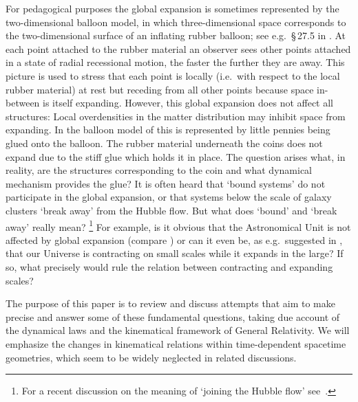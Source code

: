 \documentclass
[rmp,aps,twocolumn,showpacs,preprintnumbers,amsmath,amssymb]{revtex4}
\theoremstyle{plain}
\theoremstyle{definition}
\theoremstyle{remark}
\begin{document}
For pedagogical purposes the global expansion is sometimes represented 
by the two-dimensional balloon model, in which three-dimensional space 
corresponds to the two-dimensional surface of an inflating rubber balloon; 
see e.g.~\S\,27.5 in \cite{Misner.Thorne.Wheeler:Gravitation}. 
At each point attached to the rubber material an observer sees other points 
attached in a state of radial recessional motion, the faster the further 
they are away. This picture is used to stress that each point is locally 
(i.e.~with respect to the local rubber material) at rest but receding from 
all other points because space in-between is itself expanding. However, this 
global expansion does not affect all structures: Local overdensities in the 
matter distribution may inhibit space from expanding. In the balloon model 
of \cite{Misner.Thorne.Wheeler:Gravitation} this is represented by little 
pennies being glued onto the balloon. The rubber material underneath the 
coins does not expand due to the stiff glue which holds it in place. The 
question arises what, in reality, are the structures corresponding to the 
coin and what dynamical mechanism provides the glue? It is often heard that 
`bound systems' do not participate in the global expansion, or that 
systems below the scale of galaxy clusters `break away' from the Hubble 
flow. But what does `bound' and `break away' really mean?%
\footnote{For a recent discussion on the meaning of `joining the 
Hubble flow' see~\cite{Barnes.etal:2006}.} 
For example, is it obvious that the Astronomical Unit is not affected by 
global expansion (compare \cite{Krasinsky.Brumberg:2004,Standish:2004}) 
or can it even be, as e.g.~suggested in \cite{Fahr.Siewert:2008}, that our 
Universe is contracting on small scales while it expands in the large? 
If so, what precisely would rule the relation between contracting and 
expanding scales? 

The purpose of this paper is to review and discuss attempts that aim to 
make precise and answer some of these fundamental questions, taking due 
account of the dynamical laws and the kinematical framework of General 
Relativity. We will emphasize the changes in kinematical relations within 
time-dependent spacetime geometries, which seem to be widely neglected 
in related discussions. 
\end{document}
